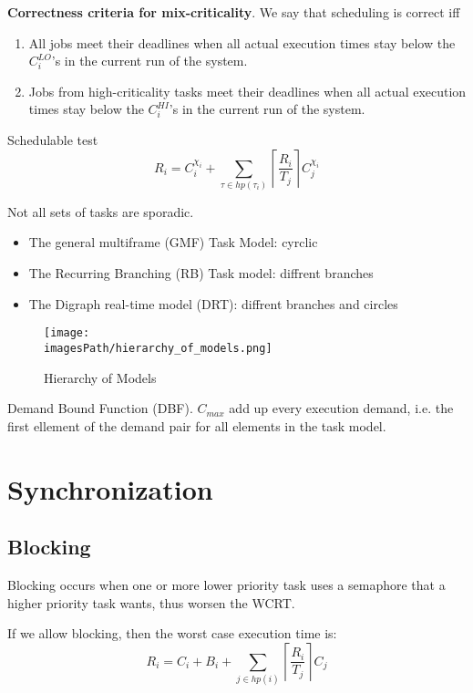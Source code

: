 \textbf{Correctness criteria for mix-criticality}. We say that scheduling is correct iff
\begin{enumerate}
  \item All jobs meet their deadlines when all actual
        execution times stay below the $C_i^{LO}$'s in the current
        run of the system.
  \item Jobs from high-criticality tasks meet their deadlines
        when all actual execution times stay below the $C_i^{HI}$'s
        in the current run of the system.
\end{enumerate}

Schedulable test
\begin{equation}
  R_i = C_i^{\chi_i} + \sum_{\tau\in hp(\tau_i)} \left\lceil \frac{R_i}{T_j} \right\rceil C_j^{\chi_i}
\end{equation}


Not all sets of tasks are sporadic.
\begin{itemize}
  \item The general multiframe (GMF) Task Model: cyrclic
  \item The Recurring Branching (RB) Task model: diffrent branches
  \item The Digraph real-time model (DRT): diffrent branches and circles
\end{itemize}

\begin{figure}[H]
    \centering
    \texttt{[image: \\imagesPath/hierarchy\_of\_models.png]}
    \caption{Hierarchy of Models}
\end{figure}


Demand Bound Function (DBF). 
$C_{max}$ add up every execution demand, i.e. the first ellement of the demand pair for all elements in the task model.



\section{Synchronization}

\subsection{Blocking}
Blocking occurs when one or more lower priority task uses a semaphore that a higher priority task wants,
thus worsen the WCRT. 

If we allow blocking, then the worst case execution time is:
\begin{equation}
  R_i = C_i + B_i + \sum_{j \in hp(i)} \left\lceil \frac{R_i}{T_j} \right\rceil C_j
\end{equation}

